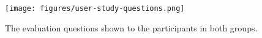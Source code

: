 \documentclass[twoside,11pt]{article}
\begin{document}
\begin{figure}
    \centering
    \texttt{[image: figures/user-study-questions.png]}
    \caption{The evaluation questions shown to the participants in both groups.}
    \label{questions}
\end{figure}




% 
% 
\end{document}
